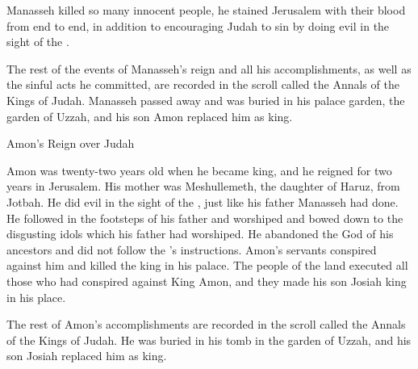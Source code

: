 {Manasseh
killed so many
innocent
people, he stained
Jerusalem
with
their blood
from end to end, in addition
to encouraging
Judah
to sin
by
doing
evil
in the sight
of the {}.
\par }{\PP {}The rest
of the events
of Manasseh’s
reign and all
his accomplishments,
as well as
the sinful
acts he committed,
are
recorded
in the scroll
called the Annals
of the Kings
of Judah.
Manasseh
passed away
and was buried
in his palace
garden,
the garden
of Uzzah,
and his son
Amon
replaced
him as king.
\par }{\SH Amon’s Reign over Judah
\par }{\PP {}Amon
was twenty-two
years
old
when he became king,
and he reigned
for two
years
in Jerusalem.
His mother
was Meshullemeth,
the daughter
of Haruz,
from
Jotbah.
He did
evil
in the sight
of the
{}, just
like his father
Manasseh
had done.
He followed
in the footsteps
of his father
and worshiped
and bowed down
to the disgusting idols
which
his father
had worshiped.
He abandoned
the {}
God
of his ancestors
and did not
follow
the
{}’s
instructions.
Amon’s
servants
conspired
against
him and killed
the king
in his palace.
The people
of the land
executed
all
those who had conspired
against
King
Amon,
and they made his son
Josiah
king
in his place.
\par }{\PP {}The rest
of Amon’s
accomplishments
are recorded
in the scroll
called the Annals
of the Kings
of Judah.
He was buried
in his tomb
in the garden
of Uzzah,
and his son
Josiah
replaced him as king.

}
